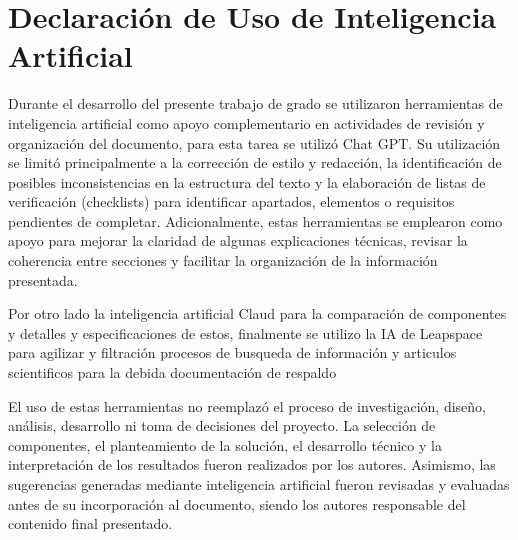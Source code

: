 \documentclass[11pt]{article}
\begin{document}
\newpage
\section{Declaración de Uso de Inteligencia Artificial}

Durante el desarrollo del presente trabajo de grado se utilizaron herramientas de inteligencia artificial como apoyo complementario en actividades de revisión y organización del documento, para esta tarea se utilizó Chat GPT. Su utilización se limitó principalmente a la corrección de estilo y redacción, la identificación de posibles inconsistencias en la estructura del texto y la elaboración de listas de verificación (checklists) para identificar apartados, elementos o requisitos pendientes de completar. Adicionalmente, estas herramientas se emplearon como apoyo para mejorar la claridad de algunas explicaciones técnicas, revisar la coherencia entre secciones y facilitar la organización de la información presentada.

Por otro lado la inteligencia artificial Claud para la comparación de componentes y detalles y especificaciones de estos, finalmente se utilizo la IA de Leapspace para agilizar y filtración procesos de busqueda de información y articulos scientificos para la debida documentación de respaldo

El uso de estas herramientas no reemplazó el proceso de investigación, diseño, análisis, desarrollo ni toma de decisiones del proyecto. La selección de componentes, el planteamiento de la solución, el desarrollo técnico y la interpretación de los resultados fueron realizados por los autores. Asimismo, las sugerencias generadas mediante inteligencia artificial fueron revisadas y evaluadas antes de su incorporación al documento, siendo los autores responsable del contenido final presentado.


%
\newpage
\nocite{*}
\end{document}
